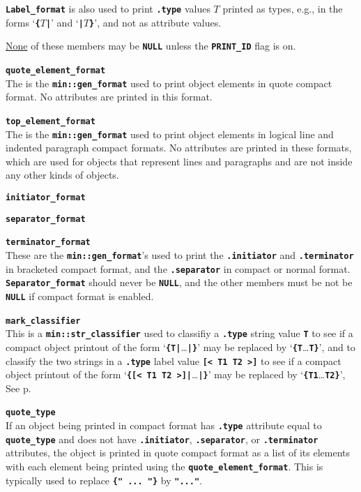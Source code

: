 \documentclass[12pt]{article}
\makeatletter
\newcommand{\TT}[1]{{\tt \bfseries #1}}
\newcommand{\ttmkey}[2]{\TT{#1}\index{#1@{\tt #1}!#2}}
\newcommand{\pagref}[1]{p\pageref{#1}}
\newcommand{\EOL}{\penalty \exhyphenpenalty}
\newenvironment{itemlist}[1][1.2in]%
	{\begin{list}{}{\setlength{\labelwidth}{#1}%
		        \setlength{\leftmargin}{\labelwidth}%
		        \addtolength{\leftmargin}{+0.2in}%
		        \renewcommand{\makelabel}[1]{##1\hfill}}}%
	{\end{list}}
\makeatother
\begin{document}
\begin{itemlist}[0.2in]
\TT{Label\_\EOL format} is also used to print \TT{.type} values $T$
printed as types, e.g., in the forms `\TT{\{$T$|}' and `\TT{|$T$\}}',
and not as attribute values.

\underline{None} of these members may be \TT{NULL} unless the
\TT{PRINT\_\EOL ID} flag is on.

\item[\ttmkey{quote\_element\_format}{in {\tt min::obj\_format}}]~\\
The is the \TT{min::gen\_format} used to print object elements
in quote compact format.  No attributes are printed in this format.

\item[\ttmkey{top\_element\_format}{in {\tt min::obj\_format}}]~\\
The is the \TT{min::gen\_format} used to print object elements
in logical line and indented paragraph compact formats.
No attributes are printed in these formats, which are used for
objects that represent lines and paragraphs and are not inside
any other kinds of objects.

\item[\ttmkey{initiator\_format}{in {\tt min::obj\_format}}]
\item[\ttmkey{separator\_format}{in {\tt min::obj\_format}}]\vspace{-2ex}
\item[\ttmkey{terminator\_format}{in {\tt min::obj\_format}}]\vspace{-2ex}~\\
These are the \TT{min::gen\_format}'s used to print the
\TT{.initiator} and \TT{.terminator} in bracketed compact
format, and the \TT{.separator} in compact or normal format.
\TT{Separator\_\EOL format} should never be \TT{NULL}, and the
other members must be not be \TT{NULL} if compact
format is enabled.

\item[\ttmkey{mark\_classifier}{in {\tt min::obj\_format}}]~\\
\label{MARK_CLASSIFIER}
This is a \TT{min::str\_classifier} used to classifiy
a \TT{.type} string value \TT{T} to see if
a compact object printout of the
form `\TT{\{T|}\ldots\TT{|\}}' may be replaced by `\TT{\{T}\ldots\TT{T\}}',
and to classify the two strings in a \TT{.type} label value \TT{[< T1 T2 >]}
to see if a compact object printout of the
form `\TT{\{[< T1 T2 >]|}\ldots\TT{|\}}' may be replaced by
`\TT{\{T1}\ldots\TT{T2\}}',
See \pagref{MARK_CLASSIFIER_USAGE}.

\item[\ttmkey{quote\_type}{in {\tt min::obj\_format}}]~\\
If an object being printed in compact format has \TT{.type} attribute
equal to \TT{quote\_\EOL type} and does not have
\TT{.initiator}, \TT{.separator}, or \TT{.terminator} attributes,
the object is printed in quote compact format
as a list of its elements with each element
being printed using the \TT{quote\_\EOL element\_\EOL format}.
This is typically used to replace \TT{\{"~...~"\}} by
\TT{"..."}.


\end{itemlist}
\end{document}
